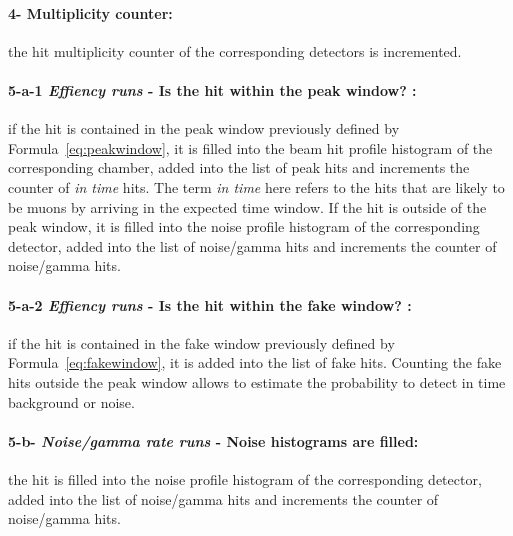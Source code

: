 	\paragraph{4- Multiplicity counter:}  the hit multiplicity counter of the corresponding detectors is incremented.
	
	\paragraph{5-a-1 \textit{Effiency runs} - Is the hit within the peak window? :} if the hit is contained in the peak window previously defined by Formula~\ref{eq:peakwindow}, it is filled into the beam hit profile histogram of the corresponding chamber, added into the list of peak hits and increments the counter of \textit{in time} hits. The term \textit{in time} here refers to the hits that are likely to be muons by arriving in the expected time window. If the hit is outside of the peak window, it is filled into the noise profile histogram of the corresponding detector, added into the list of noise/gamma hits and increments the counter of noise/gamma hits.
	
	\paragraph{5-a-2 \textit{Effiency runs} - Is the hit within the fake window? :} if the hit is contained in the fake window previously defined by Formula~\ref{eq:fakewindow}, it is added into the list of fake hits. Counting the fake hits outside the peak window allows to estimate the probability to detect in time background or noise.
	
	\paragraph{5-b- \textit{Noise/gamma rate runs} - Noise histograms are filled:} the hit is filled into the noise profile histogram of the corresponding detector, added into the list of noise/gamma hits and increments the counter of noise/gamma hits.\\
	

